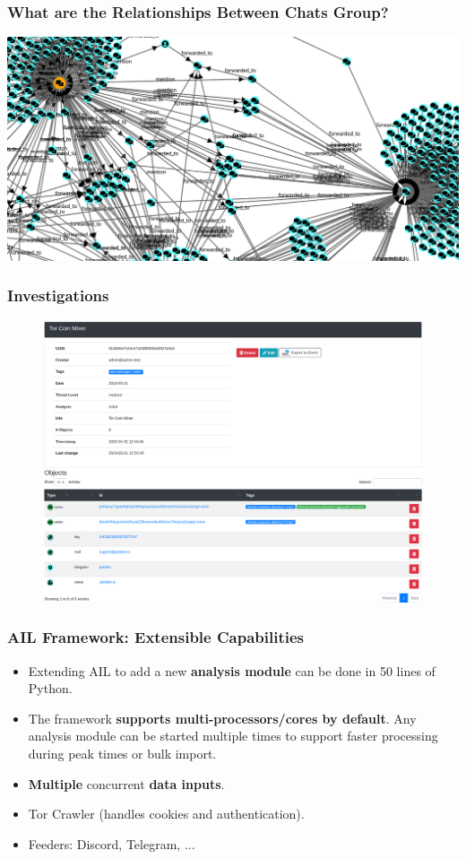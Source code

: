 \documentclass[10pt,aspectratio=169, colorlinks=true, linkcolor=circlBlue]{beamer}
\begin{document}
\begin{frame}
    \frametitle{What are the Relationships Between Chats Group?}
    \begin{center}
        \includegraphics[scale=0.27]{screenshot/noname-relationships.png}
    \end{center}
\end{frame}

\begin{frame}
    \frametitle{Investigations}
    \begin{figure}
        \includegraphics[scale=0.22, angle=0]{screenshot/investigation_mixer.png}
    \end{figure}
\end{frame}

\begin{frame}
    \frametitle{AIL Framework: Extensible Capabilities}
    \begin{itemize}
        \item Extending AIL to add a new \textbf{analysis module} can be done in 50 lines of Python.
        \item The framework \textbf{supports multi-processors/cores by default}. Any analysis module can be started multiple times to support faster processing during peak times or bulk import.
        \item \textbf{Multiple} concurrent \textbf{data inputs}.
        \item Tor Crawler (handles cookies and authentication).
        \item Feeders: Discord, Telegram, ...
    \end{itemize}
\end{frame}
\end{document}
